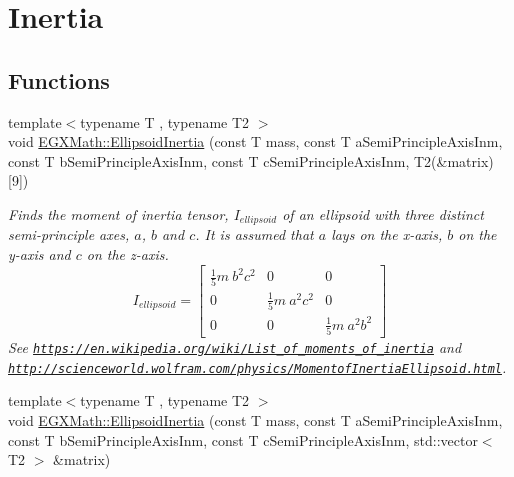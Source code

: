 \hypertarget{group___e_g_x_math-_geometry-3_d-_ellipsoid-_inertia}{}\section{Inertia}
\label{group___e_g_x_math-_geometry-3_d-_ellipsoid-_inertia}
\subsection*{Functions}
\begin{DoxyCompactItemize}
\item 
{\footnotesize template$<$typename T , typename T2 $>$ }\\void \mbox{\hyperlink{group___e_g_x_math-_geometry-3_d-_ellipsoid-_inertia_ga3b6f641f06037be75b8f51822eaa71bf}{E\+G\+X\+Math\+::\+Ellipsoid\+Inertia}} (const T mass, const T a\+Semi\+Principle\+Axis\+Inm, const T b\+Semi\+Principle\+Axis\+Inm, const T c\+Semi\+Principle\+Axis\+Inm, T2(\&matrix)\mbox{[}9\mbox{]})
\begin{DoxyCompactList}\small\item\em Finds the moment of inertia tensor, $I_{ellipsoid}$ of an ellipsoid with three distinct semi-\/principle axes, $a$, $b$ and $c$. It is assumed that $a$ lays on the x-\/axis, $b$ on the y-\/axis and $c$ on the z-\/axis. \[ I_{ellipsoid}=\begin{bmatrix} \frac{1}{5}m\ b^2c^2 & 0 & 0\\ 0 & \frac{1}{5}m\ a^2c^2 & 0\\ 0 & 0 & \frac{1}{5}m\ a^2b^2 \end{bmatrix} \] See \href{https://en.wikipedia.org/wiki/List_of_moments_of_inertia}{\tt https\+://en.\+wikipedia.\+org/wiki/\+List\+\_\+of\+\_\+moments\+\_\+of\+\_\+inertia} and \href{http://scienceworld.wolfram.com/physics/MomentofInertiaEllipsoid.html}{\tt http\+://scienceworld.\+wolfram.\+com/physics/\+Momentof\+Inertia\+Ellipsoid.\+html}. \end{DoxyCompactList}\item 
{\footnotesize template$<$typename T , typename T2 $>$ }\\void \mbox{\hyperlink{group___e_g_x_math-_geometry-3_d-_ellipsoid-_inertia_ga05dee023c58e7615d16e431bf5a99609}{E\+G\+X\+Math\+::\+Ellipsoid\+Inertia}} (const T mass, const T a\+Semi\+Principle\+Axis\+Inm, const T b\+Semi\+Principle\+Axis\+Inm, const T c\+Semi\+Principle\+Axis\+Inm, std\+::vector$<$ T2 $>$ \&matrix)

\end{DoxyCompactItemize}
